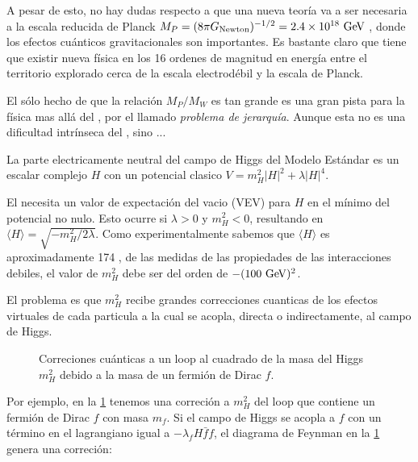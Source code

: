 A pesar de esto, no hay dudas respecto a que una nueva teor\'ia va a ser necesaria a la escala
reducida de Planck $M_P =  (8\pi G_\text{Newton})^{-1/2} = 2.4 \times 10^{18} \gev$ , donde los efectos
cu\'anticos gravitacionales son importantes. Es bastante claro que tiene que existir nueva f\'isica en
los 16 ordenes de magnitud en energ\'ia entre el territorio explorado cerca de la escala electrod\'ebil y
la escala de Planck.

El s\'olo hecho de que la relación $M_P/M_W$ es tan grande es una gran pista para la física mas
allá del {\SM}, por el llamado \emph{problema de jerarquía}. Aunque esta  no es una dificultad
intrínseca del {\SM},  sino ...

La parte electricamente neutral del campo de Higgs del Modelo Est\'andar es un escalar complejo $H$ con
un potencial clasico $V=m_H^2 |H|^2 + \lambda|H|^4$.

El {\SM} necesita un valor de expectaci\'on del vacio (VEV) para $H$ en el m\'inimo del potencial no nulo.
Esto ocurre si $\lambda>0$ y $m_H^2<0$, resultando en $\langle H \rangle = \sqrt{-m_H^2/2\lambda}$.
Como experimentalmente sabemos que $\langle H \rangle$ es aproximadamente 174 \gev, de las medidas
de las propiedades de las interacciones debiles, el valor de  $m_H^2$ debe ser del orden de $-(100 \gev)^2$.

El problema es que $m_H^2$ recibe grandes correcciones cuanticas de los efectos virtuales de cada
particula a la cual se acopla, directa o indirectamente, al campo de Higgs.

\begin{figure}[h]
  \centering

  

  \caption{Correciones cu\'anticas a un loop al cuadrado de la masa del Higgs $m_H^2$ debido a la
    masa de un fermi\'on de Dirac $f$.}\label{fig:higgs_correction_f}
\end{figure}

Por ejemplo, en la {\fig} \ref{fig:higgs_correction_f} tenemos una correci\'on a $m_H^2$ del loop
que contiene un fermi\'on de Dirac $f$ con masa $m_f$. Si el campo de Higgs se acopla a $f$ con un
término en el lagrangiano igual a $-\lambda_f H \bar{f}f$, el diagrama de Feynman en la
{\fig} \ref{fig:higgs_correction_f} genera una correci\'on:

